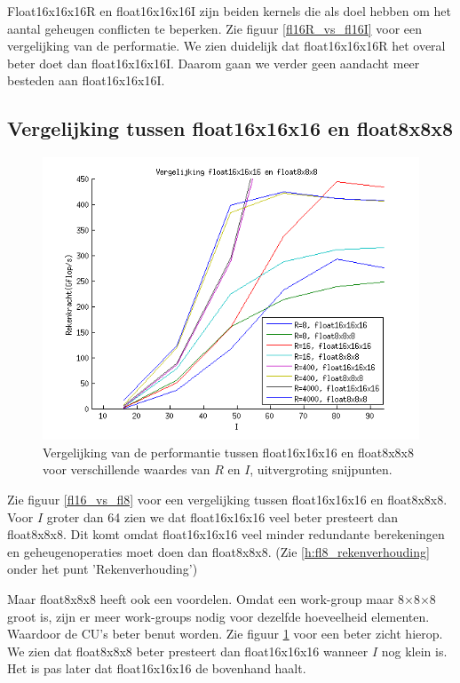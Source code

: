 Float16x16x16R en float16x16x16I zijn beiden kernels die als doel hebben om het aantal geheugen conflicten te beperken. Zie figuur \ref{fl16R_vs_fl16I} voor een vergelijking van de performatie. We zien duidelijk dat float16x16x16R het overal beter doet dan float16x16x16I. Daarom gaan we verder geen aandacht meer besteden aan float16x16x16I.

\subsection{Vergelijking tussen float16x16x16 en float8x8x8}

\begin{figure}[h!]
\centering
\includegraphics{fl16_vs_fl8_klein}
\caption{\label{fl16_vs_fl8_klein} Vergelijking van de performantie tussen float16x16x16 en float8x8x8 voor verschillende waardes van $R$ en $I$, uitvergroting snijpunten.}
\end{figure}

Zie figuur \ref{fl16_vs_fl8} voor een vergelijking tussen float16x16x16 en float8x8x8. Voor $I$ groter dan 64 zien we dat float16x16x16 veel beter presteert dan float8x8x8. Dit komt omdat float16x16x16 veel minder redundante berekeningen en geheugenoperaties moet doen dan float8x8x8. (Zie \ref{h:fl8_rekenverhouding} onder het punt 'Rekenverhouding')

Maar float8x8x8 heeft ook een voordelen. Omdat een work-group maar 8$\times$8$\times$8 groot is, zijn er meer work-groups nodig voor dezelfde hoeveelheid elementen. Waardoor de CU's beter benut worden. Zie figuur \ref{fl16_vs_fl8_klein} voor een beter zicht hierop. We zien dat float8x8x8 beter presteert dan float16x16x16 wanneer $I$ nog klein is. Het is pas later dat float16x16x16 de bovenhand haalt.

